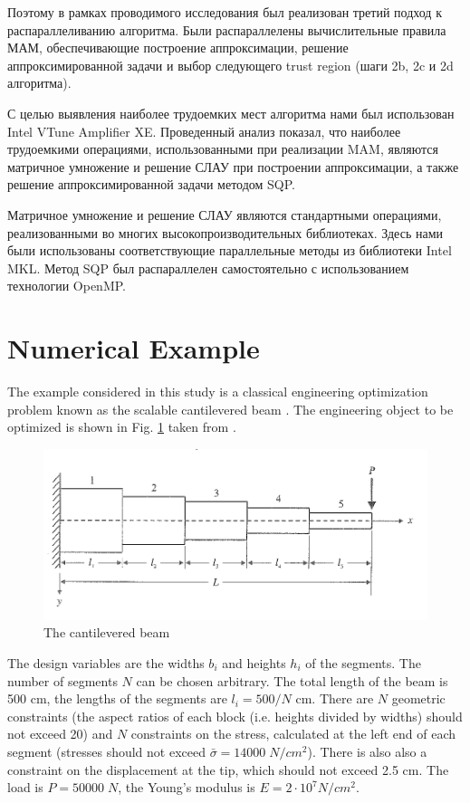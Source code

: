 \documentclass[runningheads,a4paper]{llncs}
\begin{document}
Поэтому в рамках проводимого исследования был реализован третий подход к распараллеливанию алгоритма. Были распараллелены вычислительные правила МАМ, обеспечивающие построение аппроксимации, решение аппроксимированной задачи и выбор следующего trust region (шаги 2b, 2c и 2d алгоритма).

С целью выявления наиболее трудоемких мест алгоритма нами был использован Intel VTune Amplifier XE. Проведенный анализ показал, что наиболее трудоемкими операциями, использованными при реализации MAM, являются матричное умножение и решение СЛАУ при построении аппроксимации, а также решение аппроксимированной задачи методом SQP.

Матричное умножение и решение СЛАУ являются стандартными операциями, реализованными во многих высокопроизводительных библиотеках. Здесь нами были использованы соответствующие параллельные методы из библиотеки Intel MKL. Метод SQP был распараллелен самостоятельно с использованием технологии OpenMP.


\section{Numerical Example}
\label{sec:num_example}

The example considered in this study is a classical engineering optimization problem known as the scalable cantilevered beam \cite{Vanderpllaats2001}. The engineering object to be optimized is shown in Fig. \ref{fig:beam} taken from \cite{Vanderpllaats2001}.

\begin{figure}[ht]
    \centering
    \includegraphics[width=1.0\textwidth]{beam.png}
    \caption{The cantilevered beam}
    \label{fig:beam}
\end{figure}

The design variables are the widths $b_i$ and heights $h_i$ of the segments. The number of segments $N$ can be chosen arbitrary. The total length of the beam is 500 cm, the lengths of the segments are $l_i=500/N$  cm. There are $N$ geometric constraints (the aspect ratios of each block (i.e. heights divided by widths) should not exceed 20) and $N$ constraints on the stress, calculated at the left end of each segment (stresses should not exceed  $\bar{\sigma}=14000\; N/cm^2$). There is also also a constraint on the displacement at the tip, which should not exceed 2.5 cm. The load is $P = 50 000\; N$, the Young's modulus is $E=2\cdot 10^7  N/cm^2$.
\end{document}
